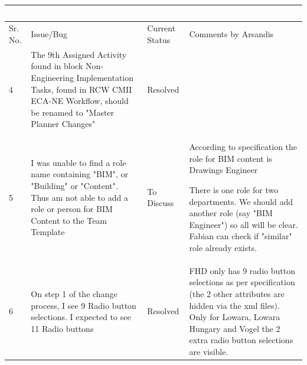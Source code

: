 \begin{tabularx}{\textwidth}{ l X l X }
        \  & \  & \  & \  \\ \hline
        Sr. No.  & Issue/Bug & Current Status & Comments by Arsandis \\ \hline
        4 & The 9th Assigned Activity found in block Non-Engineering Implementation Tasks, found in RCW CMII ECA-NE Workflow, should be renamed to "Master Planner Changes"  & Resolved &  \\ \hline
        5 & I was unable to find a role name containing "BIM", or "Building" or "Content". Thus am not able to add a role or person for BIM Content to the Team Template & To Discuss & According to specification the role for BIM content is Drawings Engineer

        There is one role for two departments. We should add another role (say "BIM Engineer") so all will be clear. Fabian can check if "similar" role already exists. \\ \hline
        6 & On step 1 of the change process, I see 9 Radio button selections.  I expected to see 11 Radio buttons & Resolved & FHD only has 9 radio button selections as per specification (the 2 other attributes are hidden via the xml files). Only for Lowara, Lowara Hungary and Vogel the 2 extra radio button selections are visible. \\ \hline

    \end{tabularx}
